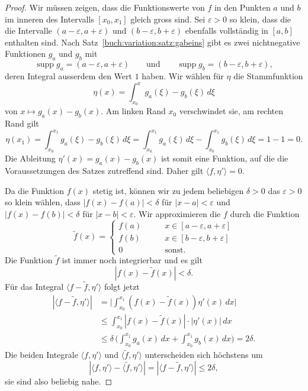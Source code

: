 

\begin{proof}
Wir müssen zeigen, dass die Funktionswerte von $f$ in den Punkten $a$ und $b$
im inneren des Intervalls $[x_0,x_1]$ gleich gross sind.
Sei $\varepsilon>0$ so klein, dass die die Intervalle
$(a-\varepsilon,a+\varepsilon)$ und $(b-\varepsilon,b+\varepsilon)$ ebenfalls
vollständig in $[a,b]$ enthalten sind.
Nach Satz~\ref{buch:variation:satz:gabeins} gibt es zwei nichtnegative
Funktionen $g_a$ und $g_b$ mit
\[
\operatorname{supp} g_a = (a-\varepsilon,a+\varepsilon)
\qquad\text{und}\qquad
\operatorname{supp} g_b = (b-\varepsilon,b+\varepsilon),
\]
deren Integral ausserdem den Wert $1$ haben.
Wir wählen für $\eta$ die Stammfunktion
\[
\eta(x)
=
\int_{x_0}^x g_a(\xi)-g_b(\xi)\,d\xi
\]
von $x\mapsto g_a(x) -g_b(x)$.
Am linken Rand $x_0$ verschwindet sie, am rechten Rand gilt
\[
\eta(x_1)
=
\int_{x_0}^{x_1}
g_a(\xi)-g_b(\xi)
\,d\xi
=
\int_{x_0}^{x_1}
g_a(\xi)
\,d\xi
-
\int_{x_0}^{x_1}
g_b(\xi)
\,d\xi
=
1-1
=
0.
\]
Die Ableitung $\eta'(x)=g_a(x)-g_b(x)$ ist somit eine Funktion,
auf die die Voraussetzungen des Satzes zutreffend sind.
Daher gilt $\langle f,\eta'\rangle=0$.

Da die Funktion $f(x)$ stetig ist, können wir zu jedem beliebigen 
$\delta>0$ das $\varepsilon>0$ so klein wählen, dass 
$|f(x)-f(a)|<\delta$ für $|x-a|<\varepsilon$ und
$|f(x)-f(b)|<\delta$ für $|x-b|<\varepsilon$.
Wir approximieren die $f$ durch die Funktion
\[
\tilde{f}(x)
=
\begin{cases}
f(a)&\qquad x\in[a-\varepsilon,a+\varepsilon]\\
f(b)&\qquad x\in[b-\varepsilon,b+\varepsilon]\\
0&\qquad\text{sonst}.
\end{cases}
\]
Die Funktion $\tilde{f}$ ist immer noch integrierbar und es gilt
\[
|f(x)-\tilde{f}(x)| < \delta.
\]
Für das Integral $\langle f-\tilde{f}, \eta'\rangle$ folgt jetzt
\begin{align*}
|\langle f-\tilde{f},\eta'\rangle|
&=
\biggl|
\int_{x_0}^{x_1}
(f(x)-\tilde{f}(x))\eta'(x)
\,dx
\biggr|
\\
&\le
\int_{x_0}^{x_1}
|f(x)-\tilde{f}(x)| \cdot |\eta'(x)|
\,dx
\\
&\le 
\delta
\,
\biggl(
\int_{x_0}^{x_1} g_a(x)\,dx
+
\int_{x_0}^{x_1} g_b(x)\,dx
\biggr)
=
2\delta.
\end{align*}
Die beiden Integrale $\langle f,\eta'\rangle$ und 
$\langle \tilde{f},\eta'\rangle$ unterscheiden sich höchstens um
\begin{equation}
|\langle f,\eta'\rangle - \langle \tilde{f},\eta'\rangle|
=
|\langle f-\tilde{f},\eta' \rangle|
\le
2\delta,
\label{buch:nichtdiff:duboisreymond:eqn:ftildef}
\end{equation}
sie sind also beliebig nahe.


\end{proof}
